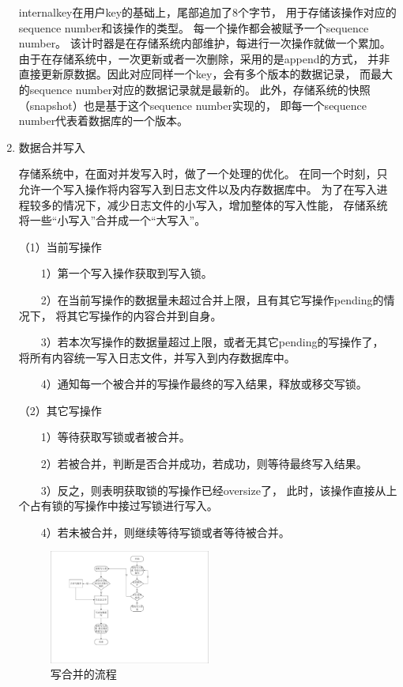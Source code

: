 \begin{enumerate}
		internalkey在用户key的基础上，尾部追加了8个字节，
		用于存储该操作对应的sequence number和该操作的类型。
		每一个操作都会被赋予一个sequence number。
		该计时器是在存储系统内部维护，每进行一次操作就做一个累加。
		由于在存储系统中，一次更新或者一次删除，采用的是append的方式，
		并非直接更新原数据。因此对应同样一个key，会有多个版本的数据记录，
		而最大的sequence number对应的数据记录就是最新的。
		此外，存储系统的快照（snapshot）也是基于这个sequence number实现的，
		即每一个sequence number代表着数据库的一个版本。

		\item 数据合并写入
		
		存储系统中，在面对并发写入时，做了一个处理的优化。
		在同一个时刻，只允许一个写入操作将内容写入到日志文件以及内存数据库中。
		为了在写入进程较多的情况下，减少日志文件的小写入，增加整体的写入性能，
		存储系统将一些“小写入”合并成一个“大写入”。

		（1）当前写操作

			\ \ \ \ 1）第一个写入操作获取到写入锁。
		
			\ \ \ \ 2）在当前写操作的数据量未超过合并上限，且有其它写操作pending的情况下，
		将其它写操作的内容合并到自身。
		
		\ \ \ \ 3）若本次写操作的数据量超过上限，或者无其它pending的写操作了，
		将所有内容统一写入日志文件，并写入到内存数据库中。
		
		\ \ \ \ 4）通知每一个被合并的写操作最终的写入结果，释放或移交写锁。

		（2）其它写操作

		\ \ \ \ 1）等待获取写锁或者被合并。
		
		\ \ \ \ 2）若被合并，判断是否合并成功，若成功，则等待最终写入结果。

		\ \ \ \ 3）反之，则表明获取锁的写操作已经oversize了，
		此时，该操作直接从上个占有锁的写操作中接过写锁进行写入。
		
		\ \ \ \ 4）若未被合并，则继续等待写锁或者等待被合并。

		\begin{figure}[H]
			\centering
			\includegraphics[width=0.50\textwidth]{pdf/write_merge.pdf}
			\caption{写合并的流程}
			\label{write_merge}
		\end{figure}


\end{enumerate}
